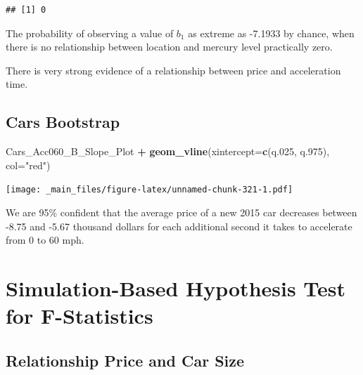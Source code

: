 \documentclass[]{book}
\newenvironment{Shaded}{\begin{snugshade}}{\end{snugshade}}
\newcommand{\KeywordTok}[1]{\textcolor[rgb]{0.13,0.29,0.53}{\textbf{#1}}}
\newcommand{\DataTypeTok}[1]{\textcolor[rgb]{0.13,0.29,0.53}{#1}}
\newcommand{\DecValTok}[1]{\textcolor[rgb]{0.00,0.00,0.81}{#1}}
\newcommand{\StringTok}[1]{\textcolor[rgb]{0.31,0.60,0.02}{#1}}
\newcommand{\OperatorTok}[1]{\textcolor[rgb]{0.81,0.36,0.00}{\textbf{#1}}}
\newcommand{\NormalTok}[1]{#1}
\begin{document}
\begin{verbatim}
## [1] 0
\end{verbatim}

The probability of observing a value of \(b_1\) as extreme as -7.1933 by
chance, when there is no relationship between location and mercury level
practically zero.

There is very strong evidence of a relationship between price and
acceleration time.

\subsection{Cars Bootstrap}\label{cars-bootstrap}

\begin{Shaded}
\end{Shaded}

\begin{Shaded}
\begin{Highlighting}[]
\NormalTok{Cars_Acc060_B_Slope_Plot }\OperatorTok{+}\StringTok{ }\KeywordTok{geom_vline}\NormalTok{(}\DataTypeTok{xintercept=}\KeywordTok{c}\NormalTok{(q.}\DecValTok{025}\NormalTok{, q.}\DecValTok{975}\NormalTok{), }\DataTypeTok{col=}\StringTok{"red"}\NormalTok{)}
\end{Highlighting}
\end{Shaded}

\texttt{[image: \_main\_files/figure-latex/unnamed-chunk-321-1.pdf]}

We are 95\% confident that the average price of a new 2015 car decreases
between -8.75 and -5.67 thousand dollars for each additional second it
takes to accelerate from 0 to 60 mph.

\section{Simulation-Based Hypothesis Test for
F-Statistics}\label{simulation-based-hypothesis-test-for-f-statistics}

\subsection{Relationship Price and Car
Size}\label{relationship-price-and-car-size}
\end{document}
